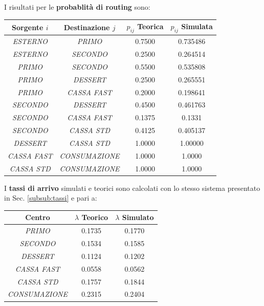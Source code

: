 \documentclass{article}
\begin{document}
I risultati per le \textbf{probablità di routing} sono:
\begin{center}\label{tab:routing_ext_1}
\begin{tabular}{|c|c|c|c|}
 \hline
 \textbf{Sorgente $i$} & \textbf{Destinazione $j$} & \textbf{\(p_{ij}\) Teorica} & \textbf{\(p_{ij}\) Simulata}\\
 \hline
 \textit{ESTERNO} & \textit{PRIMO}   & 0.7500 & 0.735486 \\
 \hline
 \textit{ESTERNO} & \textit{SECONDO}   & 0.2500 & 0.264514\\
 \hline
 \textit{PRIMO} & \textit{SECONDO}   & 0.5500 & 0.535808\\
 \hline
 \textit{PRIMO} & \textit{DESSERT}   & 0.2500 & 0.265551\\
 \hline
 \textit{PRIMO} & \textit{CASSA FAST}   & 0.2000 & 0.198641\\
\hline
 \textit{SECONDO} & \textit{DESSERT}   & 0.4500 & 0.461763\\
 \hline
 \textit{SECONDO} & \textit{CASSA FAST}   & 0.1375 & 0.1331\\
\hline
 \textit{SECONDO} & \textit{CASSA STD}   & 0.4125 & 0.405137\\
\hline
 \textit{DESSERT} & \textit{CASSA STD}   & 1.0000 & 1.00000\\
 \hline
 \textit{CASSA FAST} & \textit{CONSUMAZIONE}   & 1.0000 & 1.0000\\
 \hline
 \textit{CASSA STD} & \textit{CONSUMAZIONE}   & 1.0000 & 1.0000\\
 \hline
\end{tabular}
\end{center}
I \textbf{tassi di arrivo} simulati e teorici sono calcolati con lo stesso sistema presentato in Sec. \ref{subsub:tassi} e pari a: 
\begin{center}\label{tab:tassi_arrivo_ext_1}
\begin{tabular}{|c|c|c|}
 \hline
 \textbf{Centro} & $\lambda$ \textbf{Teorico} & $\lambda$ \textbf{Simulato}\\
 \hline
 \textit{PRIMO} & 0.1735 & 0.1770\\
 \hline
 \textit{SECONDO} & 0.1534 & 0.1585\\
 \hline
 \textit{DESSERT} & 0.1124 & 0.1202\\
 \hline
 \textit{CASSA FAST} & 0.0558 & 0.0562\\
 \hline
 \textit{CASSA STD} & 0.1757 & 0.1844\\
 \hline
 \textit{CONSUMAZIONE} & 0.2315 & 0.2404\\
 \hline
\end{tabular}
\end{center}
\end{document}
